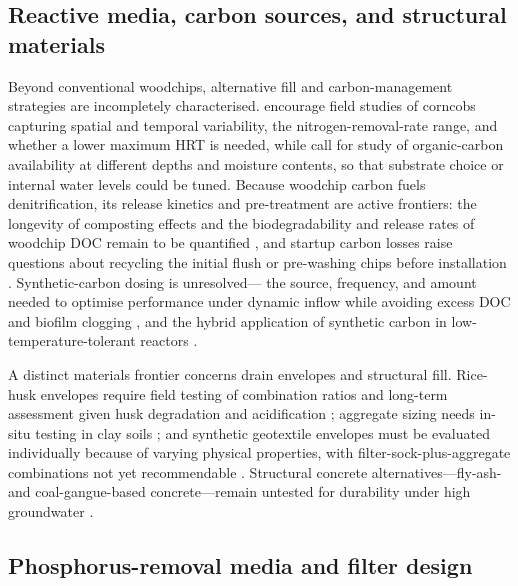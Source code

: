 \subsection{Reactive media, carbon sources, and structural materials}

Beyond conventional woodchips, alternative fill and carbon-management strategies
are incompletely characterised. \textcite{Law2023} encourage field studies of
corncobs capturing spatial and temporal variability, the nitrogen-removal-rate
range, and whether a lower maximum HRT is needed, while
\textcite{Porter2015} call for study of organic-carbon availability at different
depths and moisture contents, so that substrate choice or internal water levels
could be tuned. Because woodchip carbon fuels denitrification, its release
kinetics and pre-treatment are active frontiers: the longevity of
composting effects and the biodegradability and release rates of woodchip DOC
remain to be quantified \parencite{Kouanda2021}, and startup carbon losses raise
questions about recycling the initial flush or pre-washing chips before
installation \parencite{Abusallout2017}. Synthetic-carbon dosing is unresolved---
the source, frequency, and amount needed to optimise performance under dynamic
inflow while avoiding excess DOC and biofilm clogging \parencite{Rivas2020}, and
the hybrid application of synthetic carbon in low-temperature-tolerant reactors
\parencite{Zhang2021b}.

A distinct materials frontier concerns drain envelopes and structural fill.
Rice-husk envelopes require field testing of combination ratios and long-term
assessment given husk degradation and acidification
\parencite{Kaboosi2012,Navabian2017}; aggregate sizing needs in-situ testing in
clay soils \parencite{Byrne2023}; and synthetic geotextile envelopes must be
evaluated individually because of varying physical properties, with
filter-sock-plus-aggregate combinations not yet recommendable
\parencite{Byrne2023b}. Structural concrete alternatives---fly-ash- and
coal-gangue-based concrete---remain untested for durability under high
groundwater \parencite{Wang2016c}.

\subsection{Phosphorus-removal media and filter design}

